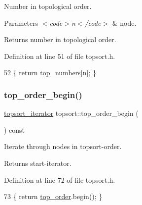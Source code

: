Number in topological order.


\begin{DoxyParams}{Parameters}
{\em $<$code$>$n$<$/code$>$} & node. \\
\hline
\end{DoxyParams}
\begin{DoxyReturn}{Returns}
number in topological order. 
\end{DoxyReturn}


Definition at line 51 of file topsort.\+h.


\begin{DoxyCode}
52     \{ \textcolor{keywordflow}{return} \mbox{\hyperlink{classtopsort_ae57da1aae22ed92acd0d84c737a1da2b}{top\_numbers}}[n]; \}
\end{DoxyCode}
\mbox{\label{classtopsort_ab220dcce845e001b0f737d0dc7751abc}} 
\subsubsection{\texorpdfstring{top\+\_\+order\+\_\+begin()}{top\_order\_begin()}}
{\footnotesize\ttfamily \mbox{\hyperlink{classtopsort_a04a42f813522640e17dddbaeb55498e4}{topsort\+\_\+iterator}} topsort\+::top\+\_\+order\+\_\+begin (\begin{DoxyParamCaption}{ }\end{DoxyParamCaption}) const\hspace{0.3cm}{\ttfamily [inline]}}

Iterate through nodes in topsort-\/order.

\begin{DoxyReturn}{Returns}
start-\/iterator. 
\end{DoxyReturn}


Definition at line 72 of file topsort.\+h.


\begin{DoxyCode}
73     \{ \textcolor{keywordflow}{return} \mbox{\hyperlink{classtopsort_a8b18b1b7ce816683694d6ac567e55cb8}{top\_order}}.begin(); \}
\end{DoxyCode}
\mbox{\label{classtopsort_ac9b784654ae0c4e9736931d63d03291b}} 
